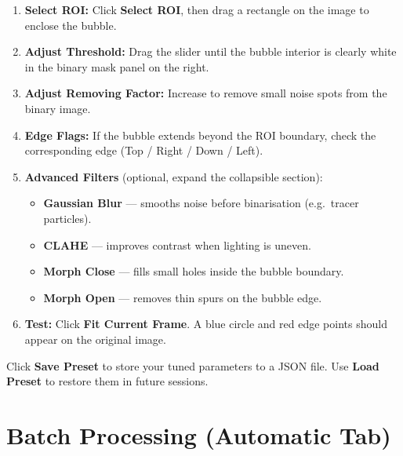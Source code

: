 \documentclass[11pt, letterpaper]{article}
\begin{document}
\begin{enumerate}
    \item \textbf{Select ROI:} Click \textbf{Select ROI}, then drag a
          rectangle on the image to enclose the bubble.

    \item \textbf{Adjust Threshold:} Drag the slider until the bubble
          interior is clearly white in the binary mask panel on the right.

    \item \textbf{Adjust Removing Factor:} Increase to remove small noise
          spots from the binary image.

    \item \textbf{Edge Flags:} If the bubble extends beyond the ROI boundary,
          check the corresponding edge (Top / Right / Down / Left).

    \item \textbf{Advanced Filters} (optional, expand the collapsible
          section):
          \begin{itemize}
              \item \textbf{Gaussian Blur} --- smooths noise before
                    binarisation (e.g.\ tracer particles).
              \item \textbf{CLAHE} --- improves contrast when lighting is
                    uneven.
              \item \textbf{Morph Close} --- fills small holes inside the
                    bubble boundary.
              \item \textbf{Morph Open} --- removes thin spurs on the bubble
                    edge.
          \end{itemize}

    \item \textbf{Test:} Click \textbf{Fit Current Frame}. A
          \textcolor{primaryblue}{blue circle} and
          \textcolor{errorred}{red edge points} should appear on the original
          image.
\end{enumerate}

\begin{tipbox}[Tip]
    Click \textbf{Save Preset} to store your tuned parameters to a JSON file.
    Use \textbf{Load Preset} to restore them in future sessions.
\end{tipbox}


\section{Batch Processing (Automatic Tab)}
\end{document}
